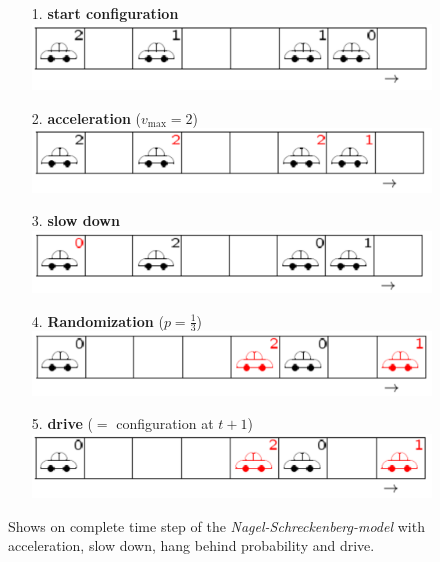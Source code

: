 \documentclass[11pt]{article}
\begin{document}
\begin{figure}[h!]
\begin{itemize}
\item[1.] \textbf{start configuration} \\
\includegraphics[width=\textwidth]{config_1.png}
\item[2.] \textbf{acceleration} ($v_{\mathrm{max}}=2$) \\
\includegraphics[width=\textwidth]{config_2.png}
\item[3.] \textbf{slow down} \\
\includegraphics[width=\textwidth]{config_3.png}
\item[4.] \textbf{Randomization} ($p=\frac{1}{3}$) \\
\includegraphics[width=\textwidth]{config_4.png}
\item[5.] \textbf{drive} ($=$ configuration at $t+1$) \\
\includegraphics[width=\textwidth]{config_5.png}
\end{itemize}
\caption{Shows on complete time step of the \textit{Nagel-Schreckenberg-model} with acceleration, slow down, hang behind probability and drive.}
\label{example_ns} 
\end{figure}\\
\end{document}
